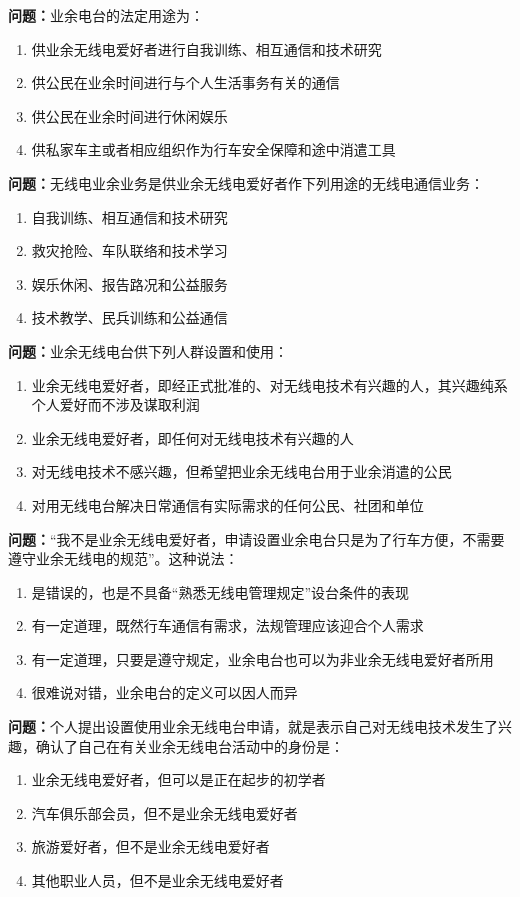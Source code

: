 \documentclass{ctexbook}
\begin{document}
\textbf{问题：}业余电台的法定用途为：
\begin{enumerate}[label=\Alph*), leftmargin=3em]
\item 供业余无线电爱好者进行自我训练、相互通信和技术研究
\item 供公民在业余时间进行与个人生活事务有关的通信
\item 供公民在业余时间进行休闲娱乐
\item 供私家车主或者相应组织作为行车安全保障和途中消遣工具
\end{enumerate}

\textbf{问题：}无线电业余业务是供业余无线电爱好者作下列用途的无线电通信业务：
\begin{enumerate}[label=\Alph*), leftmargin=3em]
\item 自我训练、相互通信和技术研究
\item 救灾抢险、车队联络和技术学习
\item 娱乐休闲、报告路况和公益服务
\item 技术教学、民兵训练和公益通信
\end{enumerate}

\textbf{问题：}业余无线电台供下列人群设置和使用：
\begin{enumerate}[label=\Alph*), leftmargin=3em]
\item 业余无线电爱好者，即经正式批准的、对无线电技术有兴趣的人，其兴趣纯系个人爱好而不涉及谋取利润
\item 业余无线电爱好者，即任何对无线电技术有兴趣的人
\item 对无线电技术不感兴趣，但希望把业余无线电台用于业余消遣的公民
\item 对用无线电台解决日常通信有实际需求的任何公民、社团和单位
\end{enumerate}

\textbf{问题：}“我不是业余无线电爱好者，申请设置业余电台只是为了行车方便，不需要遵守业余无线电的规范”。这种说法：
\begin{enumerate}[label=\Alph*), leftmargin=3em]
\item 是错误的，也是不具备“熟悉无线电管理规定”设台条件的表现
\item 有一定道理，既然行车通信有需求，法规管理应该迎合个人需求
\item 有一定道理，只要是遵守规定，业余电台也可以为非业余无线电爱好者所用
\item 很难说对错，业余电台的定义可以因人而异
\end{enumerate}

\textbf{问题：}个人提出设置使用业余无线电台申请，就是表示自己对无线电技术发生了兴趣，确认了自己在有关业余无线电台活动中的身份是：
\begin{enumerate}[label=\Alph*), leftmargin=3em]
\item 业余无线电爱好者，但可以是正在起步的初学者
\item 汽车俱乐部会员，但不是业余无线电爱好者
\item 旅游爱好者，但不是业余无线电爱好者
\item 其他职业人员，但不是业余无线电爱好者
\end{enumerate}
\end{document}
